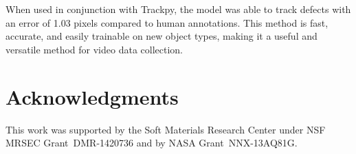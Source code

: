 \documentclass[prl,reprint,showpacs,floatfix,nofootinbib]{revtex4-1}
\begin{document}
When used in conjunction with Trackpy, the model was able to track defects with an error of 1.03 pixels compared to human annotations. This method is fast, accurate, and easily trainable on new object types, making it a useful and versatile method for video data collection.
\section{Acknowledgments}
This work was supported by the Soft Materials Research Center under NSF MRSEC Grant~DMR-1420736 and  by NASA Grant~NNX-13AQ81G.








%
%


\end{document}
